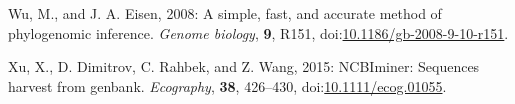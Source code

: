 \documentclass[draft]{ametsoc}
\begin{document}
\leavevmode\hypertarget{ref-wu2008simple}{}%
Wu, M., and J. A. Eisen, 2008: A simple, fast, and accurate method of
phylogenomic inference. \emph{Genome biology}, \textbf{9}, R151,
doi:\href{https://doi.org/10.1186/gb-2008-9-10-r151}{10.1186/gb-2008-9-10-r151}.

\leavevmode\hypertarget{ref-xu2015ncbiminer}{}%
Xu, X., D. Dimitrov, C. Rahbek, and Z. Wang, 2015: NCBIminer: Sequences
harvest from genbank. \emph{Ecography}, \textbf{38}, 426--430,
doi:\href{https://doi.org/10.1111/ecog.01055}{10.1111/ecog.01055}.
\end{document}
